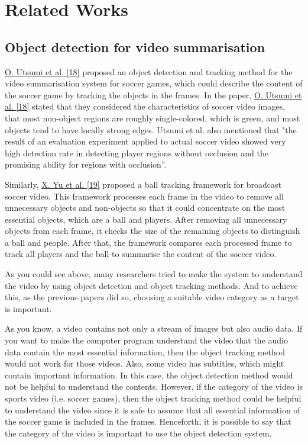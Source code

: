 \documentclass{article}
\begin{document}
\section{Related Works}

\subsection{Object detection for video summarisation}

\hyperlink{ref18}{O. Utsumi et al. [18]} proposed an object detection and tracking method for the video summarisation system for soccer games, which could describe the content of the soccer game by tracking the objects in the frames. In the paper, \hyperlink{ref18}{O. Utsumi et al. [18]} stated that they considered the characteristics of soccer video images, that most non-object regions are roughly single-colored, which is green, and most objects tend to have locally strong edges. Utsumi et al. also mentioned that "the result of an evaluation experiment applied to actual soccer video showed very high detection rate in detecting player regions without occlusion and the promising ability for regions with occlusion”.

Similarly, \hyperlink{ref19}{X. Yu et al. [19]} proposed a ball tracking framework for broadcast soccer video. This framework processes each frame in the video to remove all unnecessary objects and non-objects so that it could concentrate on the most essential objects, which are a ball and players. After removing all unnecessary objects from each frame, it checks the size of the remaining objects to distinguish a ball and people. After that, the framework compares each processed frame to track all players and the ball to summarise the content of the soccer video.

As you could see above, many researchers tried to make the system to understand the video by using object detection and object tracking methods. And to achieve this, as the previous papers did so, choosing a suitable video category as a target is important.

As you know, a video contains not only a stream of images but also audio data. If you want to make the computer program understand the video that the audio data contain the most essential information, then the object tracking method would not work for those videos. Also, some video has subtitles, which might contain important information. In this case, the object detection method would not be helpful to understand the contents. However, if the category of the video is sports video (i.e. soccer games), then the object tracking method could be helpful to understand the video since it is safe to assume that all essential information of the soccer game is included in the frames. Henceforth, it is possible to say that the category of the video is important to use the object detection system.
\end{document}
